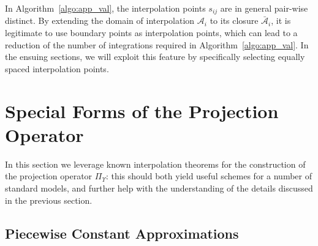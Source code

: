 \documentclass{LMCS}
\begin{document}
In Algorithm~\ref{algo:app_val}, 
the interpolation points $s_{ij}$ are in general pair-wise distinct. 
By extending the domain of interpolation $\mathcal A_i$ to its closure $\bar{\mathcal A}_i$, 
it is legitimate to use boundary points as interpolation points, 
which can lead to a reduction of the number of integrations required in Algorithm~\ref{algo:app_val}.
In the ensuing sections, we will exploit this feature by specifically selecting equally spaced interpolation points.

\section{Special Forms of the Projection Operator} 
\label{sec:proj}

In this section we leverage known interpolation theorems for the construction of the projection operator $\Pi_{\Upsilon}$: 
this should both yield useful schemes for a number of standard models, 
and further help with the understanding of the details discussed in the previous section.

\subsection{Piecewise Constant Approximations}
\label{subsec:PWC}
\end{document}
